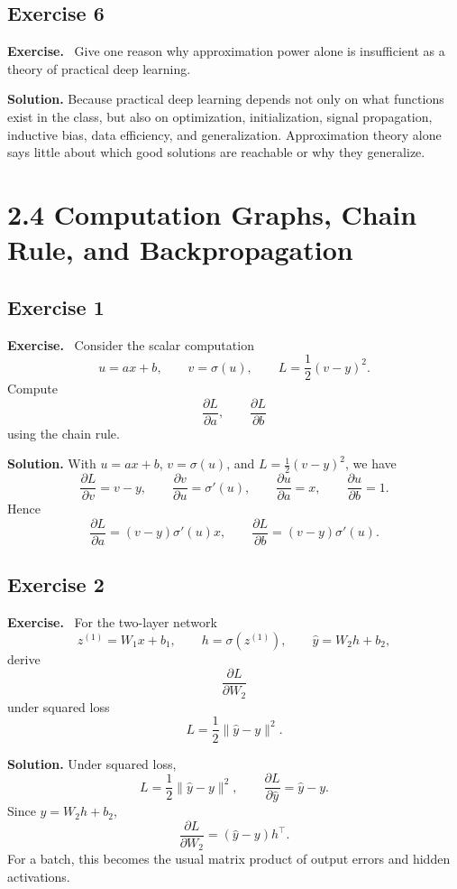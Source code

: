 \documentclass[11pt]{article}
\newenvironment{exercisebox}{\begin{framed}\noindent\textbf{Exercise.}\ }{\end{framed}}
\begin{document}
\subsection*{Exercise 6}
\begin{exercisebox}
Give one reason why approximation power alone is insufficient as a theory of practical deep learning.
\end{exercisebox}
\textbf{Solution.} Because practical deep learning depends not only on what functions exist in the class, but also on optimization, initialization, signal propagation, inductive bias, data efficiency, and generalization. Approximation theory alone says little about which good solutions are reachable or why they generalize.

\section{2.4 Computation Graphs, Chain Rule, and Backpropagation}
\subsection*{Exercise 1}
\begin{exercisebox}
Consider the scalar computation
\[
u=ax+b,\qquad v=\sigma(u),\qquad L=\frac12(v-y)^2.
\]
Compute
\[
\frac{\partial L}{\partial a},
\qquad
\frac{\partial L}{\partial b}
\]
using the chain rule.
\end{exercisebox}
\textbf{Solution.} With $u=ax+b$, $v=\sigma(u)$, and $L=\tfrac12(v-y)^2$, we have
\[
\frac{\partial L}{\partial v}=v-y,
\qquad
\frac{\partial v}{\partial u}=\sigma'(u),
\qquad
\frac{\partial u}{\partial a}=x,
\qquad
\frac{\partial u}{\partial b}=1.
\]
Hence
\[
\frac{\partial L}{\partial a}=(v-y)\sigma'(u)x,
\qquad
\frac{\partial L}{\partial b}=(v-y)\sigma'(u).
\]

\subsection*{Exercise 2}
\begin{exercisebox}
For the two-layer network
\[
z^{(1)}=W_1x+b_1,\qquad h=\sigma(z^{(1)}),\qquad \hat y=W_2h+b_2,
\]
derive
\[
\frac{\partial L}{\partial W_2}
\]
under squared loss
\[
L=\frac12\|\hat y-y\|^2.
\]
\end{exercisebox}
\textbf{Solution.} Under squared loss,
\[
L=\frac12\|\hat y-y\|^2,
\qquad
\frac{\partial L}{\partial \hat y}=\hat y-y.
\]
Since $\hat y=W_2h+b_2$,
\[
\frac{\partial L}{\partial W_2}=(\hat y-y)h^\top.
\]
For a batch, this becomes the usual matrix product of output errors and hidden activations.
\end{document}
